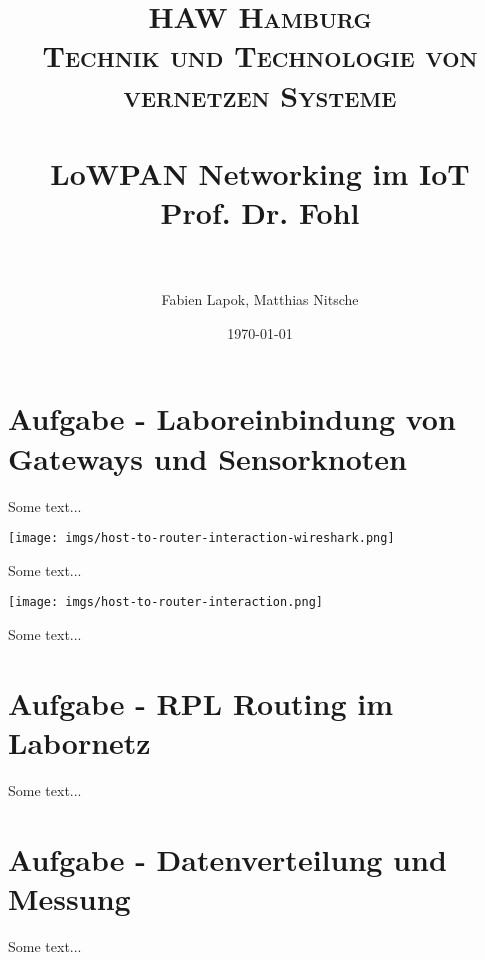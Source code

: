 \documentclass[paper=a4, fontsize=11pt]{scrartcl} %
\title {
  \normalfont \normalsize
  \textsc{HAW Hamburg} \\ [25pt] %
  \textsc{Technik und Technologie von vernetzen Systeme} \\ [15pt]
  \horrule{0.5pt} \\[0.4cm] %
  \huge LoWPAN Networking im IoT \\ [15pt] %
  \small Prof. Dr. Fohl \\
  \horrule{2pt} \\[0.5cm] %
}
\author{Fabien Lapok, Matthias Nitsche}
\date{\normalsize\today}
\numberwithin{equation}{section} %
\numberwithin{figure}{section} %
\numberwithin{table}{section} %
\begin{document}
\maketitle

\section{Aufgabe - Laboreinbindung von Gateways und Sensorknoten}

Some text...

\texttt{[image: imgs/host-to-router-interaction-wireshark.png]}

Some text...

\texttt{[image: imgs/host-to-router-interaction.png]}

Some text...

\section{Aufgabe - RPL Routing im Labornetz}

Some text...

\section{Aufgabe - Datenverteilung und Messung}

Some text...
\end{document}
